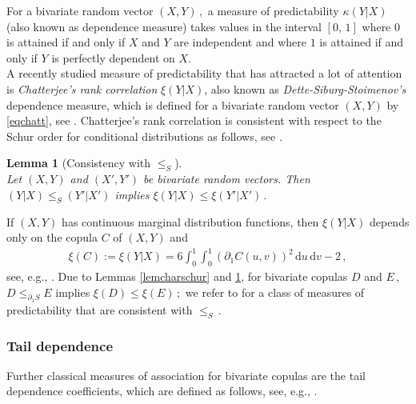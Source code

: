 \documentclass{article}
\newtheorem{lemma}[theorem]{Lemma}
\def\1{\mathds{1}} %
\newcommand{\de}{\mathrm{\,d}}
\newcommand{\R}{\mathbb{R}}
\newcommand{\Var}{\mathrm{Var}}
\begin{document}
For a bivariate random vector \((X,Y)\,,\) a measure of predictability \(\kappa(Y|X)\) (also known as dependence measure) takes values in the interval \([0,\,1]\) where \(0\) is attained if and only if \(X\) and \(Y\) are independent and where \(1\) is attained if and only if \(Y\) is perfectly dependent on $X$. \\
A recently studied measure of predictability that has attracted a lot of attention is \emph{Chatterjee's rank correlation} \(\xi(Y|X)\), also known as \emph{Dette-Siburg-Stoimenov's} dependence measure, which is defined for a bivariate random vector \((X,Y)\) by \eqref{eqchatt},
see \cite{chatterjee2020,dette2013copula}.
Chatterjee's rank correlation is consistent with respect to the Schur order for conditional distributions as follows, see \cite[Theorem 3.5]{Ansari-Fuchs-2022}.

\begin{lemma}[Consistency with \(\leq_S\)]\label{lemconS}~\\
Let \((X,Y)\) and \((X',Y')\) be bivariate random vectors.
Then \((Y|X)\leq_S (Y'|X')\) implies \(\xi(Y|X)\leq \xi(Y'|X')\,.\)
\end{lemma}

If \((X,Y)\) has continuous marginal distribution functions, then \(\xi(Y|X)\) depends only on the copula \(C\) of \((X,Y)\) and
\begin{align}\label{frm_xi_integral}
    \xi(C):=\xi(Y|X) = 6 \int_0^1\int_0^1 (\partial_1 C(u,v))^2 \de u \de v - 2\,,
\end{align}
see, e.g., \cite{fuchs2021quantifying}.
Due to Lemmas \ref{lemcharschur} and \ref{lemconS}, for bivariate copulas \(D\) and \(E\,,\) \(D\leq_{\partial_1 S} E\) implies \(\xi(D)\leq \xi(E)\,;\) we refer to \cite{Ansari-Fuchs-2023} for a class of measures of predictability that are consistent with \(\leq_S\,.\)

\subsubsection{Tail dependence}

Further classical measures of association for bivariate copulas are the tail dependence coefficients, which are defined as follows, see, e.g., \cite{Joe-1997,Nelsen-2006}.
\end{document}
